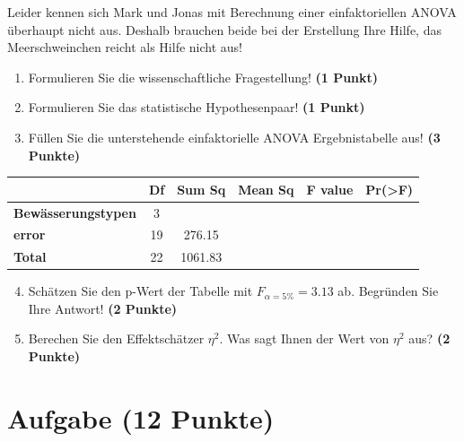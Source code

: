 \documentclass[a4paper, 9pt]{scrartcl}\usepackage[]{graphicx}\usepackage[]{xcolor}
\begin{document}
\vspace{1ex}

Leider kennen sich Mark und Jonas mit Berechnung einer einfaktoriellen ANOVA überhaupt nicht aus. Deshalb brauchen beide bei der Erstellung Ihre Hilfe, das Meerschweinchen reicht als Hilfe nicht aus! 

\begin{enumerate}
  \item Formulieren Sie die wissenschaftliche Fragestellung! \textbf{(1 Punkt)}
  \item Formulieren Sie das statistische Hypothesenpaar! \textbf{(1 Punkt)}
\item Füllen Sie die unterstehende einfaktorielle ANOVA Ergebnistabelle aus! \textbf{(3 Punkte)}
\end{enumerate}

\vspace{1Ex}

\begin{center}
  \Large
  \begin{tabular}{lccccp{3cm}}
\toprule
     & \textbf{Df} & \textbf{Sum Sq} & \textbf{Mean Sq} & \textbf{F value} & \textbf{Pr(>F)} \strut\\
    \midrule
   \textbf{Bewässerungstypen}  & 3 &  &  &  &  \strut\\
   \textbf{error}  & 19 & 276.15 &  &  &  \strut\\
   \textbf{Total}  & 22 & 1061.83 &  &  &  \strut\\
\bottomrule
  \end{tabular}
\end{center}

\vspace{1Ex}

\begin{enumerate}
  \setcounter{enumi}{3}
\item Schätzen Sie den p-Wert der Tabelle mit $F_{\alpha = 5\%} = 3.13$ ab. Begründen Sie Ihre Antwort! \textbf{(2 Punkte)}
\item Berechen Sie den Effektschätzer $\eta^2$. Was sagt Ihnen der Wert von $\eta^2$ aus? \textbf{(2 Punkte)}
\end{enumerate}



 
\clearpage

\section{Aufgabe \hfill (12 Punkte)}
\end{document}
